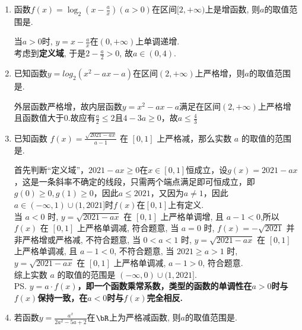 \begin{enumerate}
\begin{jieda}
        外层函数为单调减的指数函数，故要寻找整体的严格增区间，应寻找内层函数的严格减区间即$(-\infty,-1]$
    \end{jieda}
    \item 函数$f(x)=\log_2\left(x-\frac{a}{x}\right)(a>0)$在区间$[2,+\infty)$上是增函数, 则$a$的取值范围是. 
    \begin{jieda}
        当$a>0$时, $y=x-\frac{a}{x}$在$(0,+\infty)$上单调递增. \\
        考虑到\textbf{定义域}, 于是$2-\frac{a}{2}>0$, 故$a\in(0,4)$. 
    \end{jieda}
    \item 已知函数$y = log_2(x^2 - ax - a)$在区间$(2, +\infty)$上严格增，则$a$的取值范围是\blkda{$(-\infty, \frac{4}{3}]$}. 
    \begin{jieda}
        外层函数严格增，故内层函数$y = x^2 - ax - a$满足在区间$(2, +\infty)$上严格增且函数值大于0.故应有$\frac{a}{2} \leq 2$且$4-3a \geq 0$，故$a \leq \frac{4}{3}$
    \end{jieda}
    \item 已知函数 $f(x)=\frac{\sqrt{2021-a x}}{a-1}$ 在 $[0,1]$ 上严格减，那么实数 $a$ 的取值的范围是\blkda[3]{$(-\infty, 0) \cup(1,2021]$}.
    \begin{jieda}
    首先判断“定义域”，$2021-ax \geq 0$在$x \in [0, 1]$恒成立，设$g(x) = 2021-ax$，这是一条斜率不确定的线段，只需两个端点满足即可恒成立，即$g(0) \geq 0, g(1) \geq 0$，因此$a \leq 2021$，又因为$a \neq 1$，因此$a \in (-\infty, 1) \cup (1, 2021]$时$f(x)$在$[0, 1]$上有定义. \\
    当 $a<0$ 时, $y=\sqrt{2021-a x}$ 在 $[0,1]$ 上严格单调增, 且 $a-1<0$,所以 $f(x)$ 在 $[0,1]$ 上严格单调减, 符合题意, 当 $a=0$ 时, $f(x)=-\sqrt{2021}$ 并非严格增或严格减, 不符合题意, 当 $0<a<1$ 时, $y=\sqrt{2021-a x}$ 在 $[0,1]$ 上严格单调减, 且 $a-1<0$, 不符合题意, 当 $2021\geq a>1$ 时, $y=\sqrt{2021-a x}$ 在 $[0,1]$ 上严格单调减, $a-1>0$, 符合题意.\\
    综上实数 $a$ 的取值的范围是 $(-\infty, 0) \cup(1,2021]$. \\
    \ps \textbf{$y = a \cdot f(x)$，即一个函数乘常系数，类型的函数的单调性在$a > 0$时与$f(x)$保持一致，在$a < 0$时与$f(x)$完全相反.}
    \end{jieda}
    \item 若函数$y=\frac{a^x}{2a^2-5a+2}$在$\bR$上为严格减函数, 则$a$的取值范围是. 
\end{enumerate}
